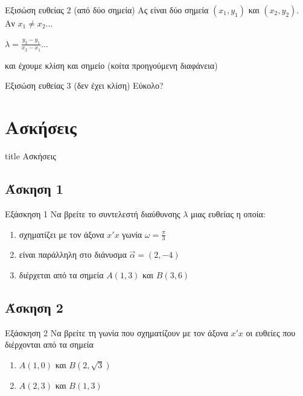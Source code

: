 \documentclass[greek]{beamer}
\begin{document}
\begin{frame}{Εξισώση ευθείας 2 (από δύο σημεία)}
 Ας είναι δύο σημεία $(x_1,y_1)$ και $(x_2,y_2)$. Αν $x_1\ne x_2$... \pause

 $λ=\frac{y_2-y_1}{x_2-x_1}$... \pause

 και έχουμε κλίση και σημείο (κοίτα προηγούμενη διαφάνεια)
\end{frame}

\begin{frame}{Εξισώση ευθείας 3 (δεν έχει κλίση)}
 Εύκολο?
\end{frame}

\section{Ασκήσεις}

\begin{frame}
 \vfill
 \centering
 \begin{beamercolorbox}[sep=8pt,center,shadow=true,rounded=true]{title}
  Ασκήσεις
 \end{beamercolorbox}
 \vfill
\end{frame}

\subsection{Άσκηση 1}
\begin{frame}[label=Άσκηση1]{Εξάσκηση 1}
 Να βρείτε το συντελεστή διαύθυνσης $λ$ μιας ευθείας η οποία:
 \begin{enumerate}
  \item<1-> σχηματίζει με τον άξονα $x'x$ γωνία $ω=\frac{π}{3}$
  \item<2-> είναι παράλληλη στο διάνυσμα $\vec{α}=(2,-4)$
  \item<3-> διέρχεται από τα σημεία $Α(1,3)$ και $Β(3,6)$
 \end{enumerate}

\end{frame}

\subsection{Άσκηση 2}
\begin{frame}[label=Άσκηση2]{Εξάσκηση 2}
 Να βρείτε τη γωνία που σχηματίζουν με τον άξονα $x'x$ οι ευθείες που διέρχονται από τα σημεία
 \begin{enumerate}
  \item<1-> $Α(1,0)$ και $Β(2,\sqrt{3})$
  \item<2-> $Α(2,3)$ και $Β(1,3)$
 \end{enumerate}

\end{frame}
\end{document}
